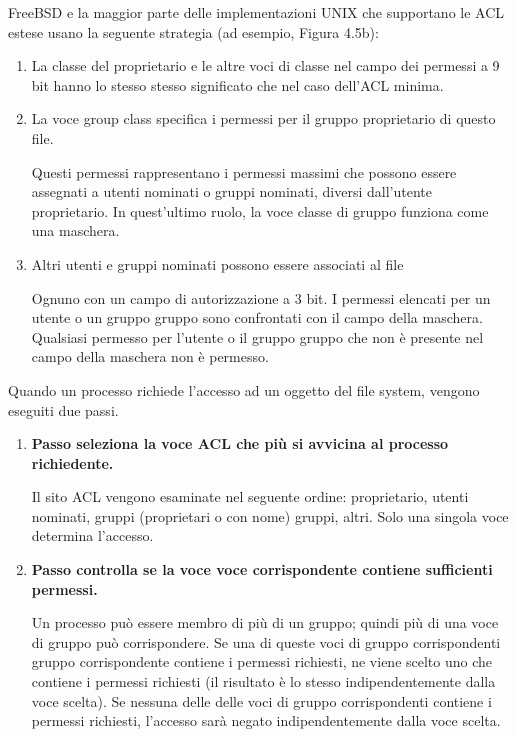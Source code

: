FreeBSD e la maggior parte delle implementazioni UNIX che supportano le ACL estese usano la seguente strategia (ad esempio, Figura 4.5b):
\begin{enumerate}
    \item La classe del proprietario e le altre voci di classe nel campo dei permessi a 9 bit hanno lo stesso stesso significato che nel caso dell'ACL minima.
    
    \item La voce group class specifica i permessi per il gruppo proprietario di questo file.


Questi permessi rappresentano i permessi massimi che possono essere assegnati a utenti nominati o gruppi nominati, diversi dall'utente proprietario. In quest'ultimo ruolo, la voce classe di gruppo funziona come una maschera.

    \item Altri utenti e gruppi nominati possono essere associati al file
    
Ognuno con un campo di autorizzazione a 3 bit. I permessi elencati per un utente o un gruppo gruppo sono confrontati con il campo della maschera. Qualsiasi permesso per l'utente o il gruppo gruppo che non è presente nel campo della maschera non è permesso.
\end{enumerate}
Quando un processo richiede l'accesso ad un oggetto del file system, vengono eseguiti due passi.

\begin{enumerate}
    \item \textbf{Passo seleziona la voce ACL che più si avvicina al processo richiedente.}
    
Il sito ACL vengono esaminate nel seguente ordine: proprietario, utenti nominati, gruppi (proprietari o con nome) gruppi, altri. Solo una singola voce determina l'accesso.

    \item \textbf{Passo controlla se la voce voce corrispondente contiene sufficienti permessi.}

Un processo può essere membro di più di un gruppo; quindi più di una voce di gruppo può corrispondere. Se una di queste voci di gruppo corrispondenti gruppo corrispondente contiene i permessi richiesti, ne viene scelto uno che contiene i permessi richiesti (il risultato è lo stesso indipendentemente dalla voce scelta). Se nessuna delle delle voci di gruppo corrispondenti contiene i permessi richiesti, l'accesso sarà negato indipendentemente dalla voce scelta.
\end{enumerate}
\newpage

